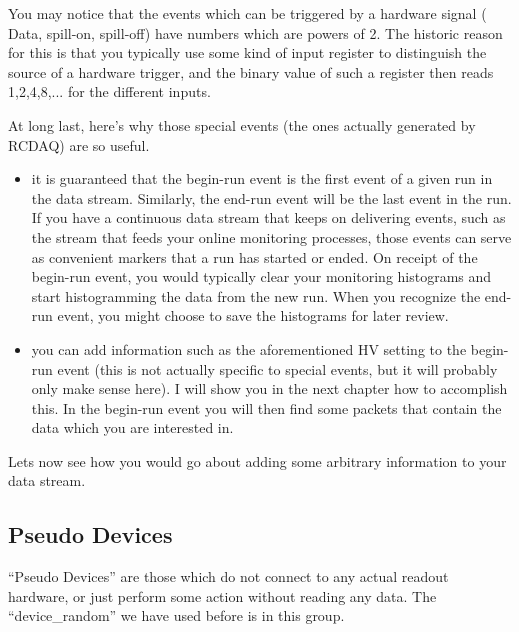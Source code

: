 \documentclass{article}[11pt]
\begin{document}
You may notice that the events which can be triggered by a hardware
signal ( Data, spill-on, spill-off) have numbers which are powers of
2. The historic reason for this is that you typically use some kind of
input register to distinguish the source of a hardware trigger, and
the binary value of such a register then reads 1,2,4,8,... for the different
inputs.

At long last, here's why those special events (the ones
actually generated by RCDAQ) are so useful.

\begin{itemize}
\item it is guaranteed that the begin-run event is the first event of
  a given run in the data stream. Similarly, the end-run event will be
  the last event in the run. If you have a continuous data stream that
  keeps on delivering events, such as the stream that feeds your
  online monitoring processes, those events can serve as convenient
  markers that a run has started or ended. On receipt of the begin-run
  event, you would typically clear your monitoring histograms and start
  histogramming the data from the new run. When you recognize the
  end-run event, you might choose to save the histograms for later
  review.

\item you can add information such as the aforementioned HV setting to
  the begin-run event (this is not actually specific to special
  events, but it will probably only make sense here). I will show you
  in the next chapter how to accomplish this. In the begin-run event
  you will then find some packets that contain the data which you are
  interested in.

\end{itemize}

Lets now see how you would go about adding some arbitrary information to your data 
stream.

\subsection{Pseudo Devices}

``Pseudo Devices'' are those which do not connect to any actual
readout hardware, or just perform some action without reading any
data.  The ``device\_random'' we have used before is in this group.
\end{document}
